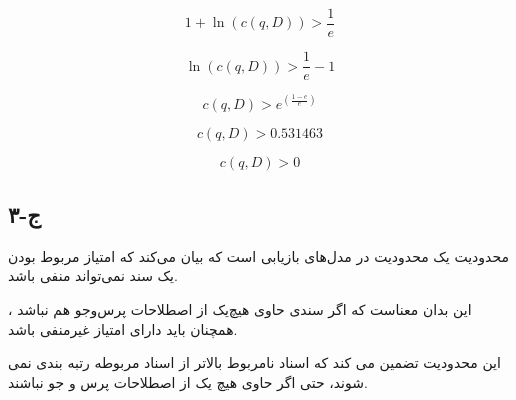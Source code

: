 \begin{boxC}
    \begin{equation*}
       1 + \ln (c(q , D)) > \frac{1}{e} 
    \end{equation*}

    \begin{equation*}
       \ln (c(q , D)) > \frac{1}{e} - 1
    \end{equation*}

    \begin{equation*}
        c(q , D) > e ^ (\frac{1-e}{e})
    \end{equation*}

    \begin{equation*}
        c(q , D) > 0.531463
    \end{equation*}

    \begin{equation*}
        c(q , D) > 0
    \end{equation*}

    
    
\end{boxC}


\newpage

\subsection{۳-ج }

\begin{boxC}
    محدودیت 
    یک محدودیت در مدل‌های بازیابی است که بیان می‌کند که امتیاز مربوط بودن یک سند نمی‌تواند منفی باشد.

    این بدان معناست که اگر سندی حاوی هیچ‌یک از اصطلاحات پرس‌وجو هم نباشد ، همچنان باید دارای امتیاز غیرمنفی‌ باشد.

    این محدودیت تضمین می کند که اسناد نامربوط بالاتر از اسناد مربوطه رتبه بندی نمی شوند، حتی اگر حاوی هیچ یک از اصطلاحات پرس و جو نباشند.
\end{boxC}